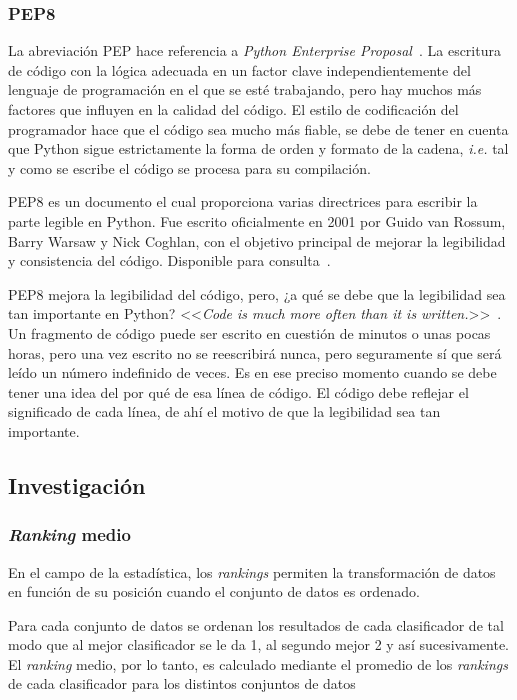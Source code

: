 \subsubsection{PEP8}
La abreviación PEP hace referencia a \textit{Python Enterprise Proposal}~\cite{pep8javatpoint}. La escritura de código con la lógica adecuada en un factor clave independientemente del lenguaje de programación en el que se esté trabajando, pero hay muchos más factores que influyen en la calidad del código. El estilo de codificación del programador hace que el código sea mucho más fiable, se debe de tener en cuenta que Python sigue estrictamente la forma de orden y formato de la cadena, \textit{i.e.} tal y como se escribe el código se procesa para su compilación.

PEP8 es un documento el cual proporciona varias directrices para escribir la parte legible en Python. Fue escrito oficialmente en 2001 por Guido van Rossum, Barry Warsaw y Nick Coghlan, con el objetivo principal de mejorar la legibilidad y consistencia del código. Disponible para consulta~\cite{rossum_warsaw_coghlan}.

PEP8 mejora la legibilidad del código, pero, ¿a qué se debe que la legibilidad sea tan importante en Python? <<\textit{Code is much more often than it is written.}>>~\cite{guidophrase}. Un fragmento de código puede ser escrito en cuestión de minutos o unas pocas horas, pero una vez escrito no se reescribirá nunca, pero seguramente sí que será leído un número indefinido de veces. Es en ese preciso momento cuando se debe tener una idea del por qué de esa línea de código. El código debe reflejar el significado de cada línea, de ahí el motivo de que la legibilidad sea tan importante.

\subsection{Investigación}
\subsubsection{\textit{Ranking} medio}
En el campo de la estadística, los \textit{rankings} permiten la transformación de datos en función de su posición cuando el conjunto de datos es ordenado.

Para cada conjunto de datos se ordenan los resultados de cada clasificador de tal modo que al mejor clasificador se le da 1, al segundo mejor 2 y así sucesivamente. El \textit{ranking} medio, por lo tanto, es calculado mediante el promedio de los \textit{rankings} de cada clasificador para los distintos conjuntos de datos

